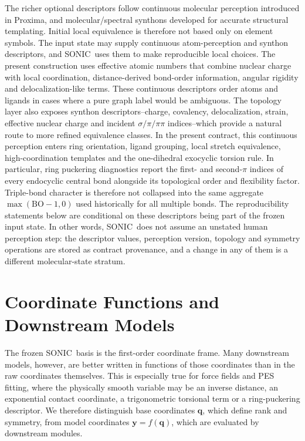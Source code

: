 \documentclass[journal=jctcce,manuscript=article,layout=traditional]{achemso}
\newcommand{\SONIC}{SONIC}
\newcommand{\q}{\mathbf{q}}
\newcommand{\y}{\mathbf{y}}
\theoremstyle{definition}
\begin{document}
The richer optional descriptors follow continuous molecular perception
introduced in Proxima,\cite{Lazzari2020Proxima} and molecular/spectral synthons developed for accurate structural
templating.\cite{Gambi2019Synthons,Lazzari2024SynthonPCS,Lazzari2025PCS141}
Initial local equivalence is therefore not based only on element symbols.  The
input state may supply continuous atom-perception and synthon
descriptors, and \SONIC\ uses them to make reproducible local choices.
The present construction uses effective atomic numbers
that combine nuclear charge with local coordination, distance-derived
bond-order information, angular rigidity and delocalization-like terms.  These
continuous descriptors order atoms and ligands in cases where a pure graph
label would be ambiguous.  The topology layer also exposes synthon
descriptors--charge, covalency, delocalization, strain, effective nuclear
charge and incident $\sigma/\pi/\pi\pi$ indices--which provide a natural route
to more refined equivalence
classes.  In the present contract, this continuous perception enters ring
orientation, ligand grouping, local stretch equivalence, high-coordination
templates and the one-dihedral exocyclic torsion rule.  In particular, ring
puckering diagnostics report the first- and second-$\pi$ indices of every
endocyclic central bond alongside its topological order and flexibility factor.
Triple-bond character is therefore not collapsed into the same aggregate
$\max(\mathrm{BO}-1,0)$ used historically for all multiple bonds.
The reproducibility statements below are conditional on these descriptors being
part of the frozen input state.  In other words, \SONIC\ does not assume an
unstated human perception step: the descriptor values, perception version,
topology and symmetry operations are stored as contract provenance, and a
change in any of them is a different molecular-state stratum.

\section{Coordinate Functions and Downstream Models}

The frozen \SONIC\ basis is the first-order coordinate frame.  Many downstream
models, however, are better written in functions of those coordinates than in
the raw coordinates themselves.  This is especially true for force fields and
PES fitting, where the physically smooth variable may be an inverse distance,
an exponential contact coordinate, a trigonometric torsional term or a
ring-puckering descriptor.  We therefore distinguish base coordinates
\(\q\), which define rank and symmetry, from model coordinates
\(\y=f(\q)\), which are evaluated by downstream modules.
\end{document}
